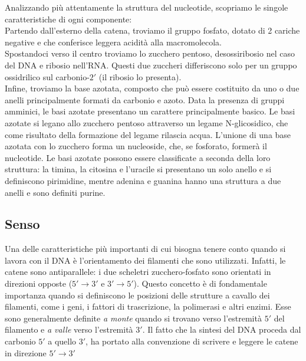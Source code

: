 \documentclass[11pt]{report}
\begin{document}
	Analizzando più attentamente la struttura del nucleotide, scopriamo le singole caratteristiche di ogni componente:\\
	
	Partendo dall'esterno della catena, troviamo il gruppo fosfato, dotato di 2 cariche negative e che conferisce leggera acidità alla macromolecola.\\
	
	Spostandoci verso il centro troviamo lo zucchero pentoso, desossiribosio nel caso  del DNA e ribosio nell'RNA. Questi due zuccheri differiscono solo per un gruppo ossidrilico sul carbonio-$2'$ (il ribosio lo presenta).\\
	
	Infine, troviamo la base azotata, composto che può essere costituito da uno o due anelli principalmente formati da carbonio e azoto. Data la presenza di gruppi amminici, le basi azotate presentano un carattere principalmente basico. Le basi azotate si legano allo zucchero pentoso attraverso un legame N-glicosidico, che come risultato della formazione del legame rilascia acqua. L'unione di una base azotata con lo zucchero forma un nucleoside, che, se fosforato, formerà il nucleotide. Le basi azotate possono essere classificate a seconda della loro struttura: la timina, la citosina e l'uracile si presentano un solo anello e si  definiscono pirimidine, mentre adenina e guanina hanno una struttura a due anelli e sono definiti purine. 
	
	\subsection{Senso}
	
	Una delle caratteristiche più importanti di cui bisogna tenere conto quando si lavora con il DNA è l'orientamento dei filamenti che sono utilizzati. Infatti, le catene sono antiparallele: i due scheletri zucchero-fosfato sono orientati in direzioni opposte ($5' \rightarrow 3'$ e $3' \rightarrow 5'$). Questo concetto è di fondamentale importanza quando si definiscono le posizioni delle strutture a cavallo dei filamenti, come i geni, i fattori di trascrizione, la polimerasi e altri enzimi. Esse sono generalmente definite \textit{a monte} quando si trovano verso l'estremità $5'$ del filamento e \textit{a valle} verso l'estremità $3'$. Il fatto che la sintesi del DNA proceda dal carbonio $5'$ a quello $3'$, ha portato alla convenzione di scrivere e leggere le catene in direzione $5' \rightarrow 3'$\\
	
\end{document}
